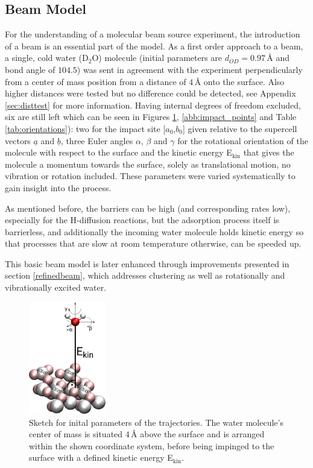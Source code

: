 \documentclass[11pt,DIV=13,BCOR=5mm,a4paper,headinclude]{scrbook}
\renewcommand{\vec}[1]{\underline{#1}}
\begin{document}
\subsection{Beam Model} \label{beammodel}
For the understanding of a molecular beam source experiment, the introduction of a beam is an essential part of the model.
As a first order approach to a beam, a single, cold water (D$_2$O) molecule (initial parameters are $d_{OD}=0.97\,$\AA{} and bond angle of $104.5$\textdegree) was sent in agreement with the experiment perpendicularly from a center of mass position from a distance of $4\,$\AA{} onto the surface.
Also higher distances were tested but no difference could be detected, see Appendix \ref{sec:disttest} for more information.
Having internal degrees of freedom excluded, six are still left which can be seen in Figures \ref{abb:initial_parameters}, \ref{abb:impact_points} and Table \ref{tab:orientations}): two for the impact site [$a_0$,$b_0$] given relative to the supercell vectors $\vec{a}$ and $\vec{b}$, three Euler angles $\alpha$, $\beta$ and $\gamma$ for the rotational orientation of the molecule with respect to the surface and the kinetic energy E$_\textrm{kin}$ that gives the molecule a momentum towards the surface, solely as translational motion, no vibration or rotation included.
These parameters were varied systematically to gain insight into the process.


As mentioned before, the barriers can be high (and corresponding rates low), especially for the H-diffusion reactions, but the adsorption process itself is barrierless, and additionally the incoming water molecule holds kinetic energy so that processes that are slow at room temperature otherwise, can be speeded up.


This basic beam model is later enhanced through improvements presented in section \ref{refinedbeam}, which addresses clustering as well as rotationally and vibrationally excited water.

\begin{figure}[!ht]
 \centering
\includegraphics[width=0.3\textwidth]{figures/0001/perspective+h2o_new.png}
 \caption{Sketch for inital parameters of the trajectories.
The water molecule's center of mass is situated $4\,$\AA{} above the surface and is arranged within the shown coordinate system, before being impinged to the surface with a defined kinetic energy E$_\textrm{kin}$.}
        \label{abb:initial_parameters}
 \end{figure}
 
\end{document}
